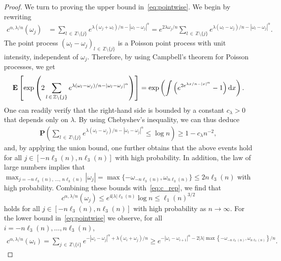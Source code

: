 \documentclass[10pt]{amsart}
\theoremstyle{definition}\newtheorem{defi}[theo]{Definition}\newtheorem{rema}[theo]{Remark}\newtheorem{exam}[theo]{Example}\newtheorem{exem}[theo]{Example}\newtheorem{nota}[theo]{Notation}
\newcommand{\Z}{\mathbb Z}
\newcommand{\bfP}{\mathbf{P}}
\newcommand{\bfE}{\mathbf{E}}
\newcommand{\dd}{\text{\upshape{d}}}
\begin{document}
\begin{proof}
We turn to proving the upper bound in~\eqref{eq:pointwise}. We begin by rewriting
\begin{align}\label{eq:c_rep}
c^{\alpha,\lambda/n}(\omega_j)&=\sum_{l\,\in\,\Z\setminus\{j\}}e^{\lambda\left(\omega_j+\omega_l\right)/n-\left|\omega_l-\omega_j\right|^\alpha}=e^{2\lambda\omega_j/n}\sum_{l\,\in\,\Z\setminus\{j\}}e^{\lambda\left(\omega_l-\omega_j\right)/n-\left|\omega_l-\omega_j\right|^\alpha}.
\end{align}
The point process $(\omega_l-\omega_j)_{l\,\in\,\Z\setminus\{j\}}$ is a Poisson point process with unit intensity, independent of $\omega_j$. Therefore, by using Campbell's theorem for Poisson processes, we get
\begin{align*}
\bfE\left[\exp\left(2\sum_{l\,\in\,\Z\setminus\{j\}}e^{\lambda(\omega_l-\omega_j)/n-\left|\omega_l-\omega_j\right|^\alpha}\right)\right] =\exp\left(\int \left(e^{2e^{\lambda x/n -|x|^\alpha}}-1\right) \dd x\right).
\end{align*}
One can readily verify that the right-hand side is bounded by a constant $c_\lambda>0$ that depends only on $\lambda$. By using Chebyshev's inequality, we can thus deduce
\begin{align*}
\bfP\left(\sum_{l\,\in\,\Z\setminus\{j\}}e^{\lambda\left(\omega_l-\omega_j\right)/n-\left|\omega_l-\omega_j\right|^\alpha} \le \log n\right)\ge 1-c_\lambda n^{-2},
\end{align*}
and, by applying the union bound, one further obtains that the above events hold for all $j\in[-n\ell_3(n),n\ell_3(n)]$ with high probability. In addition, the law of large numbers implies that $\max_{j=-n\ell_3(n),\,\dots,\,n\ell_3(n)}|\omega_j| = \max\{-\omega_{-n\ell_3(n)},\omega_{n\ell_3(n)}\}\leq 2n\ell_3(n)$ with high probability. Combining these bounds with~\eqref{eq:c_rep}, we find that
\begin{equation}\label{eq:mass3/2}
c^{\alpha,\lambda/n}(\omega_j)
\le e^{4|\lambda| \ell_3(n)}\log n \le \ell_1(n)^{3/2}
\end{equation}
holds for all $j\in[-n\ell_3(n),n\ell_3(n)]$ with high probability as $n\to\infty$. For the lower bound in~\eqref{eq:pointwise} we observe, for all $i=-n\ell_3(n),\dots,n\ell_3(n)$,
\begin{align*}
c^{\alpha,\lambda/n}(\omega_i)=\sum_{j\,\in\,\Z\setminus\{i\}} e^{-\left|\omega_i-\omega_j\right|^\alpha+\lambda\left(\omega_i+\omega_j\right)/n}\geq e^{-\left|\omega_i-\omega_{i+1}\right|^\alpha-2|\lambda|\max\left\{-\omega_{-n\ell_3(n)},\omega_{n\ell_3(n)}\right\}/n}.
\end{align*}

\end{proof}
\end{document}
